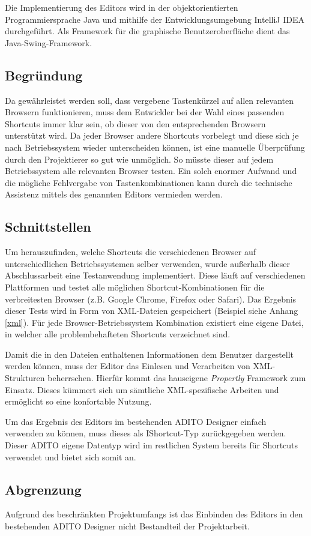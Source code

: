Die Implementierung des Editors wird in der objektorientierten Programmiersprache Java und mithilfe der Entwicklungsumgebung IntelliJ IDEA durchgeführt. Als Framework für die graphische Benutzeroberfläche dient das Java-Swing-Framework.

\subsection{Begründung}

Da gewährleistet werden soll, dass vergebene Tastenkürzel auf allen relevanten Browsern funktionieren, muss dem Entwickler bei der Wahl eines passenden Shortcuts immer klar sein, ob dieser von den entsprechenden Browsern unterstützt wird. Da jeder Browser andere Shortcuts vorbelegt und diese sich je nach Betriebssystem wieder unterscheiden können, ist eine manuelle Überprüfung durch den Projektierer so gut wie unmöglich. So müsste dieser auf jedem Betriebssystem alle relevanten Browser testen. Ein solch enormer Aufwand und die mögliche Fehlvergabe von Tastenkombinationen kann durch die technische Assistenz mittels des genannten Editors vermieden werden.

\subsection{Schnittstellen}
\label{schnittstellen} 

Um herauszufinden, welche Shortcuts die verschiedenen Browser auf unterschiedlichen Betriebssystemen selber verwenden, wurde außerhalb dieser Abschlussarbeit eine Testanwendung implementiert. Diese läuft auf verschiedenen Plattformen und testet alle möglichen Shortcut-Kombinationen für die verbreitesten Browser (z.B. Google Chrome, Firefox oder Safari). Das Ergebnis dieser Tests wird in Form von XML-Dateien gespeichert (Beispiel siehe Anhang \ref{xml}). Für jede Browser-Betriebssystem Kombination existiert eine eigene Datei, in welcher alle problembehafteten Shortcuts verzeichnet sind.

Damit die in den Dateien enthaltenen Informationen dem Benutzer dargestellt werden können, muss der Editor das Einlesen und Verarbeiten von XML-Strukturen beherrschen. Hierfür kommt das hauseigene \emph{Propertly} Framework zum Einsatz. Dieses kümmert sich um sämtliche XML-spezifische Arbeiten und ermöglicht so eine konfortable Nutzung.

Um das Ergebnis des Editors im bestehenden ADITO Designer einfach verwenden zu können, muss dieses als IShortcut-Typ zurückgegeben werden. Dieser ADITO eigene Datentyp wird im restlichen System bereits für Shortcuts verwendet und bietet sich somit an.

\subsection{Abgrenzung}

Aufgrund des beschränkten Projektumfangs ist das Einbinden des Editors in den bestehenden ADITO Designer nicht Bestandteil der Projektarbeit.






\newpage